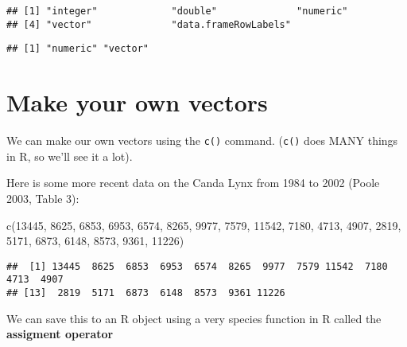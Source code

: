 \documentclass[
]{book}
\newenvironment{Shaded}{\begin{snugshade}}{\end{snugshade}}
\newcommand{\DecValTok}[1]{\textcolor[rgb]{0.00,0.00,0.81}{#1}}
\newcommand{\FunctionTok}[1]{\textcolor[rgb]{0.00,0.00,0.00}{#1}}
\newcommand{\NormalTok}[1]{#1}
\newcommand{\SpecialCharTok}[1]{\textcolor[rgb]{0.00,0.00,0.00}{#1}}
\begin{document}
\begin{verbatim}
## [1] "integer"             "double"              "numeric"            
## [4] "vector"              "data.frameRowLabels"
\end{verbatim}

\begin{Shaded}
\end{Shaded}

\begin{verbatim}
## [1] "numeric" "vector"
\end{verbatim}

\hypertarget{make-your-own-vectors}{%
\section{Make your own vectors}\label{make-your-own-vectors}}

We can make our own vectors using the \texttt{c()} command. (\texttt{c()} does MANY things in R, so we'll see it a lot).

Here is some more recent data on the Canda Lynx from 1984 to 2002 (Poole 2003, Table 3):

\begin{Shaded}
\begin{Highlighting}[]
\FunctionTok{c}\NormalTok{(}\DecValTok{13445}\NormalTok{, }\DecValTok{8625}\NormalTok{, }\DecValTok{6853}\NormalTok{, }\DecValTok{6953}\NormalTok{, }\DecValTok{6574}\NormalTok{,}
  \DecValTok{8265}\NormalTok{, }\DecValTok{9977}\NormalTok{, }\DecValTok{7579}\NormalTok{, }\DecValTok{11542}\NormalTok{, }\DecValTok{7180}\NormalTok{,}
  \DecValTok{4713}\NormalTok{, }\DecValTok{4907}\NormalTok{, }\DecValTok{2819}\NormalTok{, }\DecValTok{5171}\NormalTok{, }\DecValTok{6873}\NormalTok{, }
  \DecValTok{6148}\NormalTok{, }\DecValTok{8573}\NormalTok{, }\DecValTok{9361}\NormalTok{, }\DecValTok{11226}\NormalTok{)}
\end{Highlighting}
\end{Shaded}

\begin{verbatim}
##  [1] 13445  8625  6853  6953  6574  8265  9977  7579 11542  7180  4713  4907
## [13]  2819  5171  6873  6148  8573  9361 11226
\end{verbatim}

We can save this to an R object using a very species function in R called the \textbf{assigment operator}
\end{document}
